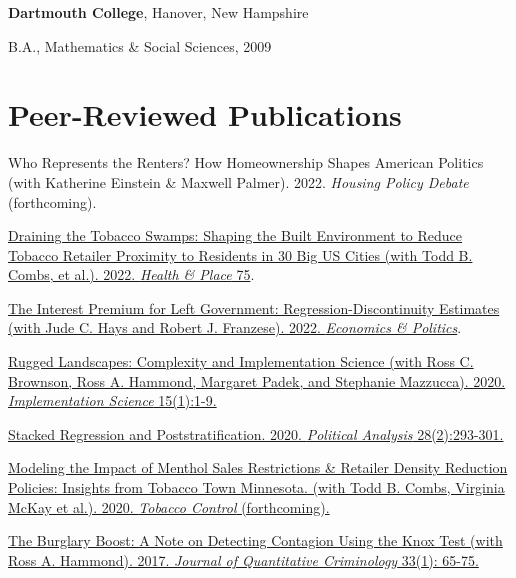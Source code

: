 \documentclass[margin,line]{res}
\newenvironment{list1}{
  \begin{list}{}{%
      \setlength{\itemsep}{0.1in}
      \setlength{\parsep}{0in} \setlength{\parskip}{0in}
      \setlength{\topsep}{0.1in} \setlength{\partopsep}{0in} 
      \setlength{\leftmargin}{0.17in}}}{\end{list}}
\newenvironment{publist}{
	\begin{list}{}{%
			\setlength{\itemsep}{0.15in}
			\setlength{\parsep}{0in} \setlength{\parskip}{0in}
			\setlength{\topsep}{0in} \setlength{\partopsep}{0in} 
			\setlength{\leftmargin}{0.15in}
			\setlength{\itemindent}{-0.15in}}}
		{\end{list}}
\begin{document}
\begin{resume}
{\bf Dartmouth College}, Hanover, New Hampshire
\begin{list1}
\item[] B.A., Mathematics \& Social Sciences, 2009
\end{list1}




\section{\sc Peer-Reviewed Publications}

\begin{publist}
	
	\item Who Represents the Renters? How Homeownership Shapes American Politics (with Katherine Einstein \& Maxwell Palmer). 2022. \textit{Housing Policy Debate} (forthcoming). 
	
	\item \href{https://www.sciencedirect.com/science/article/pii/S1353829222000764}{Draining the Tobacco Swamps: Shaping the Built Environment to Reduce Tobacco Retailer Proximity to Residents in 30 Big US Cities (with Todd B. Combs, et al.). 2022. \textit{Health \& Place} 75}.
	
	\item \href{https://onlinelibrary.wiley.com/doi/abs/10.1111/ecpo.12204}{The Interest Premium for Left Government: Regression-Discontinuity Estimates (with Jude C. Hays and Robert J. Franzese). 2022. \textit{Economics \& Politics}}.
			
	\item \href{https://link.springer.com/article/10.1186/s13012-020-01028-5}{Rugged Landscapes: Complexity and Implementation Science (with Ross C. Brownson, Ross A. Hammond, Margaret Padek, and Stephanie Mazzucca). 2020. \textit{Implementation Science} 15(1):1-9.}
	
	\item \href{https://doi.org/10.1017/pan.2019.43}{Stacked Regression and Poststratification. 2020. \textit{Political Analysis} 28(2):293-301.}
	
	\item \href{http://dx.doi.org/10.1136/tobaccocontrol-2019-054986}{Modeling the Impact of Menthol Sales Restrictions \& Retailer Density Reduction Policies: Insights from Tobacco Town Minnesota. (with Todd B. Combs, Virginia McKay et al.). 2020. \textit{Tobacco Control} (forthcoming).}
	
	\item \href{https://joeornstein.github.io/publications/Ornstein-Hammond2017.pdf}{The Burglary Boost: A Note on Detecting Contagion Using the Knox Test (with Ross A. Hammond). 2017. \textit{Journal of Quantitative Criminology} 33(1): 65-75.}
	

\end{publist}
\end{resume}
\end{document}
